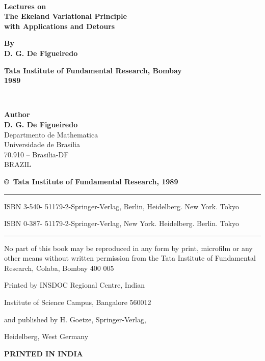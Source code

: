 ~\phantom{a}
\thispagestyle{empty}
\begin{center}
{\Large\bf Lectures on}\\[5pt]
{\Large\bf The Ekeland Variational Principle}\\
{\Large\bf with Applications and Detours}
\vfill

{\bf By}\\[5pt]
{\large\bf D. G. De Figueiredo}
\vfill

{\bf Tata Institute of Fundamental Research, Bombay}\\
{\bf 1989}
\end{center}
\eject

~\phantom{a}
\thispagestyle{empty}
\begin{center}
{\large\bf Author}\\[4pt]
{\large\bf D. G. De Figueiredo}\\
{Departmento de Mathematica}\\
{Universidade de Brasilia}\\
{70.910 -- Brasilia-DF}\\
{BRAZIL}
\vfill

{\bf\copyright\ Tata Institute of Fundamental Research, 1989}
\vskip 1cm

\noindent
\rule{\textwidth}{1pt}

\noindent
{\small ISBN 3-540- 51179-2-Springer-Verlag, Berlin, Heidelberg. New
York. Tokyo}

\noindent

{\small ISBN 0-387- 51179-2-Springer-Verlag, New
York. Heidelberg. Berlin. Tokyo}

\noindent
\rule{\textwidth}{1pt}


\vfill

\parbox{0.7\textwidth}{No part of this book may be reproduced in any
  form by print, microfilm or any other means without written
  permission from the Tata Institute of Fundamental Research, Colaba,
  Bombay 400 005}

\vfill
Printed by INSDOC Regional Centre, Indian

Institute of Science Campus, Bangalore 560012

and published by H. Goetze, Springer-Verlag,

Heidelberg, West Germany
\bigskip

{\bf PRINTED IN INDIA}
\end{center}

\eject


